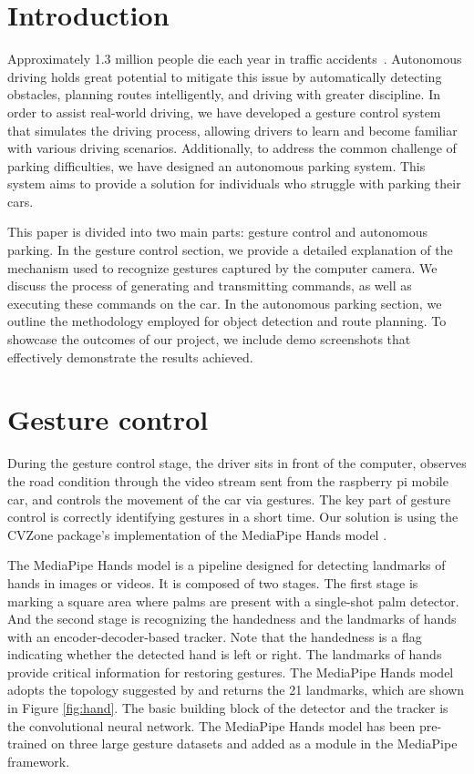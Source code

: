 \documentclass[acmsmall]{acmart}
\begin{document}
\section{Introduction}
Approximately 1.3 million people die each year in traffic accidents~\cite{who-road-traffic-injuries}. Autonomous driving holds great potential to mitigate this issue by automatically detecting obstacles, planning routes intelligently, and driving with greater discipline. In order to assist real-world driving, we have developed a gesture control system that simulates the driving process, allowing drivers to learn and become familiar with various driving scenarios. Additionally, to address the common challenge of parking difficulties, we have designed an autonomous parking system. This system aims to provide a solution for individuals who struggle with parking their cars.

This paper is divided into two main parts: gesture control and autonomous parking. In the gesture control section, we provide a detailed explanation of the mechanism used to recognize gestures captured by the computer camera. We discuss the process of generating and transmitting commands, as well as executing these commands on the car. In the autonomous parking section, we outline the methodology employed for object detection and route planning. To showcase the outcomes of our project, we include demo screenshots that effectively demonstrate the results achieved.

\section{Gesture control}
During the gesture control stage, the driver sits in front of the computer, observes the road condition through the video stream sent from the raspberry pi mobile car, and controls the movement of the car via gestures. The key part of gesture control is correctly identifying gestures in a short time. Our solution is using the CVZone package's implementation of the MediaPipe Hands model \cite{cvzone}.

The MediaPipe Hands model is a pipeline designed for detecting landmarks of hands in images or videos. It is composed of two stages. The first stage is marking a square area where palms are present with a single-shot palm detector. And the second stage is recognizing the handedness and the landmarks of hands with an encoder-decoder-based tracker. Note that the handedness is a flag indicating whether the detected hand is left or right. The landmarks of hands provide critical information for restoring gestures. The MediaPipe Hands model adopts the topology suggested by \cite{hand} and returns the 21 landmarks, which are shown in Figure \ref{fig:hand}. The basic building block of the detector and the tracker is the convolutional neural network. The MediaPipe Hands model has been pre-trained on three large gesture datasets and added as a module in the MediaPipe framework.
\end{document}
